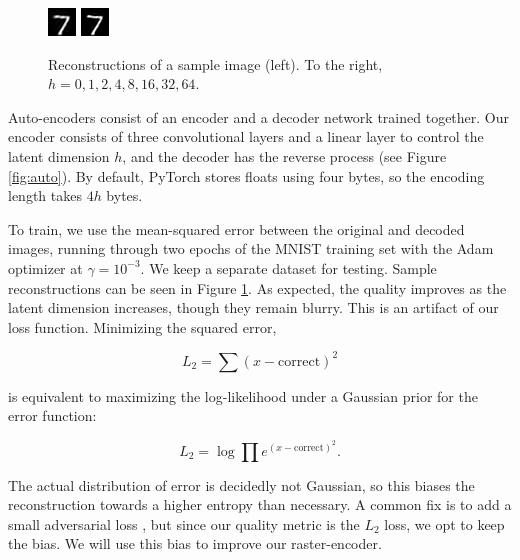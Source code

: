 \documentclass[11pt]{article}
\begin{document}
\begin{figure}[t]
  \includegraphics[width=0.2\columnwidth]{diagrams/reconstructions/32.png}
  \includegraphics[width=0.2\columnwidth]{diagrams/reconstructions/64.png}
  \caption{Reconstructions of a sample image (left). To the right, $h=0, 1, 2, 4, 8, 16, 32, 64$.}
  \label{fig:recon}
\end{figure}

Auto-encoders consist of an encoder and a decoder network trained together. Our encoder consists of three convolutional layers and a linear layer to control the latent dimension $h$, and the decoder has the reverse process (see Figure \ref{fig:auto}). By default, PyTorch stores floats using four bytes, so the encoding length takes $4h$ bytes.

To train, we use the mean-squared error between the original and decoded images, running through two epochs of the MNIST training set with the Adam optimizer at $\gamma=10^{-3}$. We keep a separate dataset for testing. Sample reconstructions can be seen in Figure \ref{fig:recon}. As expected, the quality improves as the latent dimension increases, though they remain blurry. This is an artifact of our loss function. Minimizing the squared error,

$$L_2 = \sum (x-\mathrm{correct})^2$$

is equivalent to maximizing the log-likelihood under a Gaussian prior for the error function:

$$L_2 = \log\prod e^{(x-\mathrm{correct})^2}.$$

The actual distribution of error is decidedly not Gaussian, so this biases the reconstruction towards a higher entropy than necessary. A common fix is to add a small adversarial loss \citep{makhzani-2016-adversarial}, but since our quality metric is the $L_2$ loss, we opt to keep the bias. We will use this bias to improve our raster-encoder.
\end{document}
